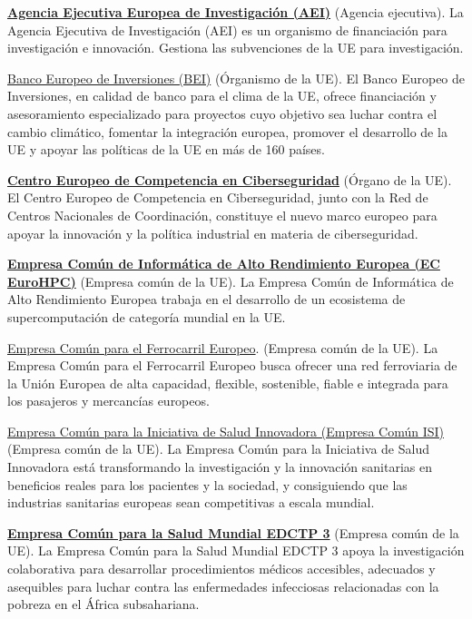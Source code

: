 \documentclass[10pt,a4paper]{article}
\begin{document}
\href{https://ec.europa.eu/info/departments/european-research-executive-agency_es}{\textbf{Agencia Ejecutiva Europea de Investigación (AEI)}} (Agencia ejecutiva). La Agencia Ejecutiva de Investigación (AEI) es un organismo de financiación para investigación e innovación. Gestiona las subvenciones de la UE para investigación.

\href{https://www.eib.org/en/index.htm}{Banco Europeo de Inversiones (BEI)} (Órganismo de la UE). El Banco Europeo de Inversiones, en calidad de banco para el clima de la UE, ofrece financiación y asesoramiento especializado para proyectos cuyo objetivo sea luchar contra el cambio climático, fomentar la integración europea, promover el desarrollo de la UE y apoyar las políticas de la UE en más de 160 países.

\href{https://cybersecurity-centre.europa.eu/index_es}{\textbf{Centro Europeo de Competencia en Ciberseguridad}} (Órgano de la UE). El Centro Europeo de Competencia en Ciberseguridad, junto con la Red de Centros Nacionales de Coordinación, constituye el nuevo marco europeo para apoyar la innovación y la política industrial en materia de ciberseguridad.

\href{https://eurohpc-ju.europa.eu/index_en}{\textbf{Empresa Común de Informática de Alto Rendimiento Europea (EC EuroHPC)}} (Empresa común de la UE). La Empresa Común de Informática de Alto Rendimiento Europea trabaja en el desarrollo de un ecosistema de supercomputación de categoría mundial en la UE.

\href{https://rail-research.europa.eu/}{Empresa Común para el Ferrocarril Europeo}. (Empresa común de la UE). La Empresa Común para el Ferrocarril Europeo busca ofrecer una red ferroviaria de la Unión Europea de alta capacidad, flexible, sostenible, fiable e integrada para los pasajeros y mercancías europeos.

\href{https://www.ihi.europa.eu/}{Empresa Común para la Iniciativa de Salud Innovadora (Empresa Común ISI)} (Empresa común de la UE). La Empresa Común para la Iniciativa de Salud Innovadora está transformando la investigación y la innovación sanitarias en beneficios reales para los pacientes y la sociedad, y consiguiendo que las industrias sanitarias europeas sean competitivas a escala mundial.

\href{https://www.global-health-edctp3.europa.eu/index_en}{\textbf{Empresa Común para la Salud Mundial EDCTP 3}} (Empresa común de la UE). La Empresa Común para la Salud Mundial EDCTP 3 apoya la investigación colaborativa para desarrollar procedimientos médicos accesibles, adecuados y asequibles para luchar contra las enfermedades infecciosas relacionadas con la pobreza en el África subsahariana.
\end{document}

